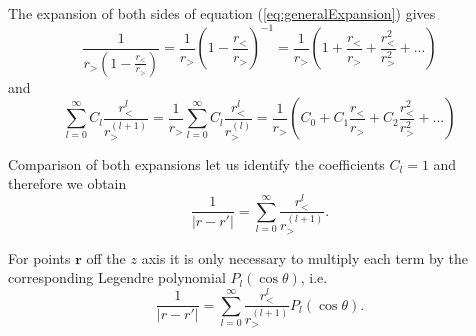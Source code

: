 The expansion of both sides of equation (\ref{eq:generalExpansion}) gives
 \begin{equation}
 \frac{1}{r_>\left( 1 - \frac{r_<}{r_>} \right)} = \frac{1}{r_>}\left( 1 - \frac{r_<}{r_>} \right)^{-1} =   \frac{1}{r_>}\left( 1 + \frac{r_<}{r_>} + \frac{r_<^2}{r_>^2} + ... \right)
 \end{equation}
 and 
 \begin{equation}
 \sum_{l=0} ^\infty C_l \frac{r^l _<}{ r^{(l+1)}_> } = \frac{1}{r_>} \sum_{l=0} ^\infty C_l \frac{r^l _<}{ r^{(l)}_> } = \frac{1}{r_>}\left( C_0 + C_1 \frac{r_<}{r_>} + C_2 \frac{r_<^2}{r_>^2} + ... \right)
 \end{equation}
 
 Comparison of both expansions let us identify the coefficients $C_l = 1$ and therefore we obtain 
 \begin{equation}
  \frac{1}{\left| r - r' \right|}  = \sum_{l=0} ^\infty \frac{r^l _<}{ r^{(l+1)}_> }.
\end{equation}

For points $\textbf{r}$ off the $z$ axis it is only necessary to multiply each term by the corresponding Legendre polynomial $P_l(\cos \theta)$, i.e.
\begin{equation}
\frac{1}{\left| r - r' \right|} = \sum_{l=0} ^\infty \frac{r^l _<}{ r^{(l+1)}_> } P_l(\cos \theta).
\end{equation}